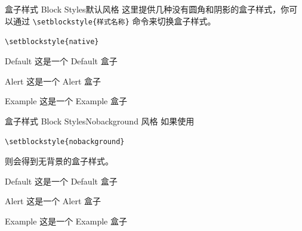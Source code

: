 \documentclass[10pt,aspectratio=169,fontset=none]{ctexbeamer}
\begin{document}
    \begin{frame}{盒子样式 Block Styles}{默认风格}
        这里提供几种没有圆角和阴影的盒子样式，你可以通过 \texttt{\textcolor{primary}{\textbackslash setblockstyle}\{样式名称\}} 命令来切换盒子样式。

        \begin{center}
            \texttt{\textcolor{primary}{\textbackslash setblockstyle}\{native\}}
        \end{center}

        \centering
        \begin{minipage}[b]{0.5\textwidth}
            \begin{block}{Default}
                这是一个 Default 盒子
            \end{block}
            \begin{alertblock}{Alert}
                这是一个 Alert 盒子
            \end{alertblock}
            \begin{exampleblock}{Example}
                这是一个 Example 盒子
            \end{exampleblock} 
        \end{minipage}

    \end{frame}

    \begin{frame}{盒子样式 Block Styles}{Nobackground 风格}
    如果使用    

        \begin{center}
            \texttt{\textcolor{primary}{\textbackslash setblockstyle}\{nobackground\}}
        \end{center}
    则会得到无背景的盒子样式。
        \centering
        \begin{minipage}[b]{0.5\textwidth}
            \begin{block}{Default}
                这是一个 Default 盒子
            \end{block}
            \begin{alertblock}{Alert}
                这是一个 Alert 盒子
            \end{alertblock}
            \begin{exampleblock}{Example}
                这是一个 Example 盒子
            \end{exampleblock}       
        \end{minipage}

    \end{frame}
\end{document}

